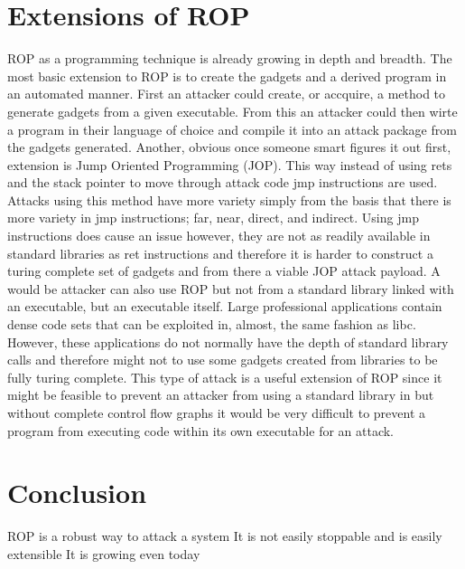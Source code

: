 \documentclass[11pt]{amsart}
\begin{document}
\section*{Extensions of ROP}
ROP as a programming technique is already growing in depth and breadth.  The most basic extension to ROP is to create the gadgets and a derived program in an automated manner.  First an attacker could create, or accquire, a method to generate gadgets from a given executable.  From this an attacker could then wirte a program in their language of choice and compile it into an attack package from the gadgets generated.
Another, obvious once someone smart figures it out first, extension is Jump Oriented Programming (JOP).  This way instead of using rets and the stack pointer to move through attack code jmp instructions are used.  Attacks using this method have more variety simply from the basis that there is more variety in jmp instructions; far, near, direct, and indirect.  Using jmp instructions does cause an issue however, they are not as readily available in standard libraries as ret instructions and therefore it is harder to construct a turing complete set of gadgets and from there a viable JOP attack payload.
A would be attacker can also use ROP but not from a standard library linked with an executable, but an executable itself. Large professional applications contain dense code sets that can be exploited in, almost, the same fashion as libc.  However, these applications do not normally have the depth of standard library calls and therefore might not to use some gadgets created from libraries to be fully turing complete.  This type of attack is a useful extension of ROP since it might be feasible to prevent an attacker from using a standard library in but without complete control flow graphs it would be very difficult to prevent a program from executing code within its own executable for an attack.
\section*{Conclusion}
ROP is a robust way to attack a system
It is not easily stoppable and is easily extensible
It is growing even today
\end{document}

